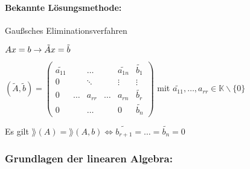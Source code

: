 \paragraph{Bekannte Lösungsmethode:} Gaußsches Eliminationsverfahren

$Ax=b \rightarrow \tilde{A}x= \tilde{b} \\$

$(\tilde{A},\tilde{b})=
\begin{pmatrix} 
\widetilde{a_{11}} & &\dots  &  & \widetilde{a_{1n}} & \widetilde{b_1} \\
0 & & \ddots &  & \vdots & \vdots \\
0 & \dots & a_{rr} & \dots & a_{rn} & \widetilde{b_r} \\
0 & & \dots & & 0 & \widetilde{b_n} \end{pmatrix} $
mit $\widetilde{a_{11}}, \dots, a_{rr} \in \mathbb{K} \backslash \{0\} $

Es gilt $\rang(A)= \rang (A,b) \Leftrightarrow 
\widetilde{b_{r+1}} = \dots = \widetilde{b_n} = 0 $

\subsubsection*{Grundlagen der linearen Algebra:}


